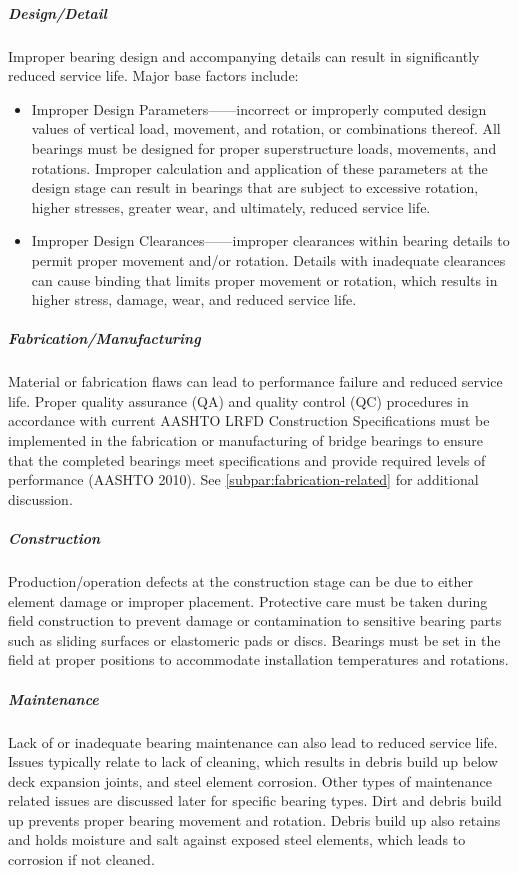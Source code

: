 \subparagraph*{Design/Detail}
Improper bearing design and accompanying details can result in significantly reduced service life. Major base
factors include:
\begin{itemize}
    \item Improper Design Parameters——incorrect or improperly computed design values of vertical load, movement,
    and rotation, or combinations thereof. All bearings must be designed for proper superstructure loads, movements, and
    rotations. Improper calculation and application of these parameters at the design stage can result in bearings that are
    subject to excessive rotation, higher stresses, greater wear, and ultimately, reduced service life.
    \item Improper Design Clearances——improper clearances within bearing details to permit proper movement and/or
    rotation. Details with inadequate clearances can cause binding that limits proper movement or rotation, which results
    in higher stress, damage, wear, and reduced service life.
\end{itemize}

\subparagraph{Fabrication/Manufacturing}
Material or fabrication flaws can lead to performance failure and reduced service life. Proper quality assurance (QA) and quality control (QC) procedures in accordance with current AASHTO LRFD Construction Specifications must be implemented in the fabrication or manufacturing of bridge bearings to ensure that the completed bearings meet specifications and provide required levels of performance (AASHTO 2010). See \cref{subpar:fabrication-related} for additional discussion.

\subparagraph{Construction}
Production/operation defects at the construction stage can be due to either element damage or improper placement. Protective care must be taken during field construction to prevent damage or contamination to sensitive bearing parts such as sliding surfaces or elastomeric pads or discs. Bearings must be set in the field at proper positions to accommodate installation temperatures and rotations.

\subparagraph{Maintenance}
Lack of or inadequate bearing maintenance can also lead to reduced service life. Issues typically relate to lack of cleaning, which results in debris build up below deck expansion joints, and steel element corrosion. Other types of maintenance related issues are discussed later for specific bearing types. Dirt and debris build up prevents proper bearing movement and rotation. Debris build up also retains and holds moisture and salt against exposed steel elements, which leads to corrosion if not cleaned.

